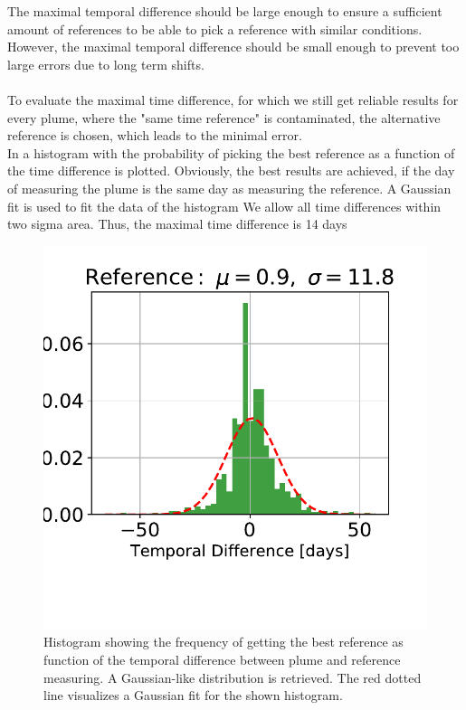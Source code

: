 The maximal temporal difference should be large enough to ensure a sufficient amount of references to be able to pick a reference with similar conditions. However, the maximal temporal difference should be small enough to prevent too large  errors due to long term shifts.\\
\\
To evaluate the maximal time difference, for which we still get reliable results for every plume, where the "same time reference" is contaminated, the alternative reference is chosen, which leads to the minimal  error.\\
%
In  a histogram with the probability of picking the best reference as a function of the time difference is plotted. Obviously, the best results are achieved, if the day of measuring the plume is the same day as measuring the reference. A Gaussian fit is used to fit the data of the histogram We allow all time differences within two sigma area. Thus, the maximal time difference is 14 days\\
\begin{figure}
	\centering
	\includegraphics[width=0.7\linewidth]{Bilder/Hist}
	\caption{Histogram showing the frequency of getting the best reference as function of the temporal difference between plume and reference measuring. A Gaussian-like distribution is retrieved. The red dotted line visualizes a Gaussian fit for the shown histogram.}
	\label{fig:Hist}
\end{figure}
